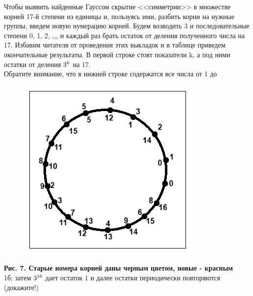 \begin{multicols}{2}
    Чтобы выявить найденные Гауссом скрытие <<симметрии>> в множестве корней 17-й степени из единицы и, пользуясь ими, разбить корни на нужные группы, введем новую нумерацию корней. Будем возводить 3 и последовательные степени 0, 1, 2, ,,, и каждый раз брать остаток от деления полученного числа на 17. Избавим читателя от проведения этих выкладок и в таблице приведем окончательные результаты. В первой строке стоят показатели k, а под ними остатки от деления $3\sp{k}$ на 17.\\
    Обратите внимание, что в нижней строке содержатся все числа от 1 до
    \columnbreak
    \begin{figure}[H]
        \includegraphics[width=\columnwidth]{Untitled2.png}
    \end{figure}
    \noindent\scriptsize\textbf{Рис. 7. Старые номера корней даны черным цветом, новые - красным}\\[2em]
    \normalsize
    1б; затем $3\sp{16}$ дает остаток 1 и далее остатки периодически повторяются (докажите!)\par
    

\end{multicols}
